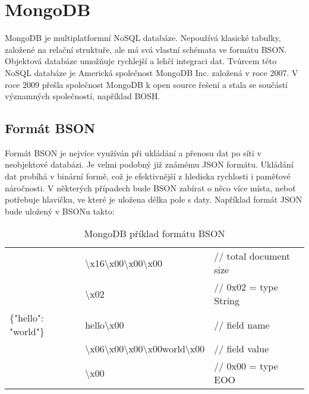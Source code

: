 \section {MongoDB}
\par MongoDB\cite{mongodb} je multiplatformní NoSQL databáze. Nepoužívá klasické tabulky, založené na relační struktuře, ale má svá vlastní schémata ve formátu BSON\cite{mongogbinc}. Objektová databáze umožňuje rychlejší a lehčí integraci dat. Tvůrcem této NoSQL databáze je Americká společnost MongoDB\cite{mongodb} Inc. založená v roce 2007. V roce 2009 přešla společnost MongoDB\cite{mongodb} k open source řešení a stala se součástí významných společností, například BOSH.
\subsection {Formát BSON}
\par Formát BSON\cite{mongogbinc} je nejvíce využíván při ukládání a přenosu dat po síti v neobjektové databázi. Je velmi podobný již známému JSON formátu. Ukládání dat probíhá v binární formě, což je efektivnější z hlediska rychlosti i paměťové náročnosti. V některých případech bude BSON zabírat o něco více místa, neboť potřebuje hlavičku, ve které je uložena délka pole s daty.
Například formát JSON bude uložený v BSON\cite{mongogbinc}u takto: 

\begin{table}[h]
\begin{tabulary}{\textwidth} {| l | l | l |}
 						& \textbackslash{x}16\textbackslash{x}00\textbackslash{x}00\textbackslash{x}00 								&// total document size \\
 						& \textbackslash{x}02 																						&// 0x02 = type String\\
\{"hello": "world"\} 	& hello\textbackslash{x}00 																					&// field name\\
 						& \textbackslash{x}06\textbackslash{x}00\textbackslash{x}00\textbackslash{x}00world\textbackslash{x}00 		&// field value\\
 						& \textbackslash{x}00 																						&// 0x00 = type EOO \\
\end{tabulary}
\caption[MongoDB příklad formátu BSON]{MongoDB příklad formátu BSON}\label{tab:bson}
\end{table}
\vfill